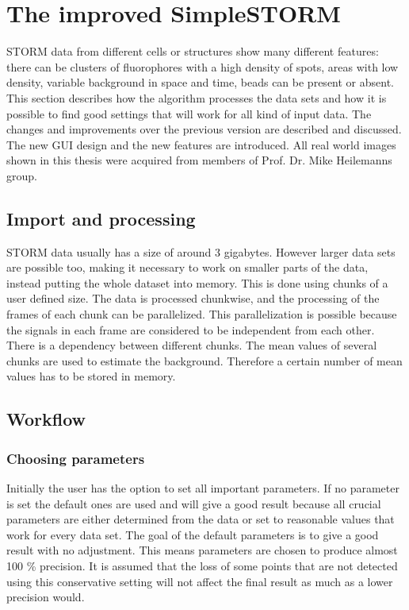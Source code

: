 \chapter{The improved SimpleSTORM}
STORM data from different cells or structures show many different features: there can be clusters of fluorophores with a high density of spots, areas with low density, variable background in space and time, beads can be present or absent.\newline
This section describes how the algorithm processes the data sets and how it is possible to find good settings that will work for all kind of input data. The changes and improvements over the previous version are described and discussed. The new GUI design and the new features are introduced.\newline
All real world images shown in this thesis were acquired from members of Prof. Dr. Mike Heilemanns group.


\section*{Import and processing}
STORM data usually has a size of around 3 gigabytes. However larger data sets are possible too, making it necessary to work on smaller parts of the data, instead putting the whole dataset into memory. This is done using chunks of a user defined size. The data is processed chunkwise, and the processing of the frames of each chunk can be parallelized. This parallelization is possible because the signals in each frame are considered to be independent from each other. There is a dependency between different chunks. The mean values of several chunks are used to estimate the background. Therefore a certain number of mean values has to be stored in memory.

\section{Workflow}
\subsection{Choosing parameters}
Initially the user has the option to set all important parameters. If no parameter is set the default ones are used and will give a good result because all crucial parameters are either determined from the data or set to reasonable values that work for every data set. The goal of the default parameters is to give a good result with no adjustment. This means parameters are chosen to produce almost 100 \% precision. It is assumed that the loss of some points that are not detected using this conservative setting will not affect the final result as much as a lower precision would.
